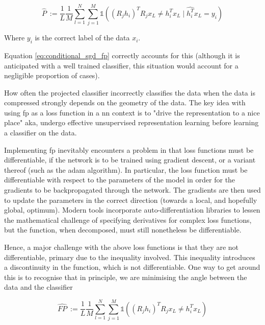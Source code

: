 \begin{equation}
\label{eq:conditional_sgd_fp}
\hat{P}\ := \frac{1}{L}\frac{1}{M}\sum_{l = 1}^N \sum_{j = 1}^M  \mathds{1}( (R_j h_i)^T R_jx_L \neq h_i^Tx_L \mid \hat{h_i^T}x_L = y_i )  
\end{equation}

Where $y_i$ is the correct label of the data $x_i$. 
\bigskip

Equation \ref{eq:conditional_sgd_fp} correctly accounts for this (although it is anticipated with a well trained classifier, this situation would account for a negligible proportion of cases). 
\bigskip

How often the projected classifier incorrectly classifies the data when the data is compressed strongly depends on the geometry of the data. The key idea with using \gls{fp} as a loss function in a \gls{nn} context is to "drive the representation to a nice place" aka, undergo effective unsupervised representation learning before learning a classifier on the data. 
\bigskip


Implementing  \gls{fp} inevitably encounters a problem in that loss functions must be differentiable, if the network is to be trained using gradient descent, or a variant thereof (such as the \gls{adam} algorithm). In particular, the loss function must be differentiable with respect to the parameters of the model in order for the gradients to be backpropagated through the network. The gradients are then used to update the parameters in the correct direction (towards a local, and hopefully global, optimum). Modern tools incorporate auto-differentiation libraries to lessen the mathematical challenge of specifying derivatives for complex loss functions, but the function, when decomposed, must still nonetheless be differentiable.
\bigskip

Hence, a major challenge with the above loss functions is that they are not differentiable, primary due to the inequality involved. This inequality introduces a discontinuity in the function, which is not differentiable. One way to get around this is to recognise that in principle, we are minimising the angle between the data and the classifier \cite{}

\begin{equation}
\label{eq:sgd_fp}
\hat{FP}\ := \frac{1}{L}\frac{1}{M}\sum_{l = 1}^N \sum_{j = 1}^M \mathds{1}((R_j h_i)^T R_jx_L \neq h_i^Tx_L)  
\end{equation}

